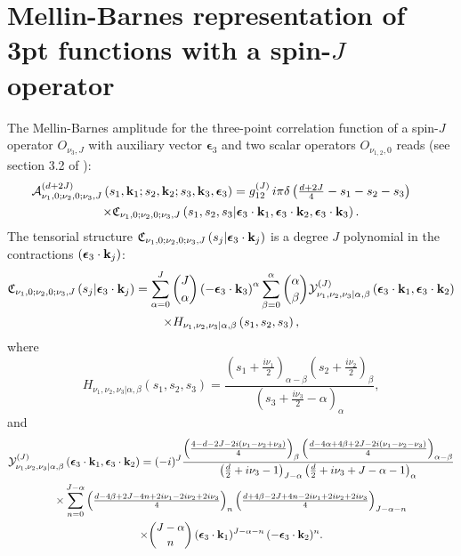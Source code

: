 \documentclass[11pt,a4paper]{article}
\begin{document}
\section{Mellin-Barnes representation of 3pt functions with a spin-$J$ operator}
\label{APP::00J}

The Mellin-Barnes amplitude for the three-point correlation function of a spin-$J$ operator $O_{\nu_3,J}$ with auxiliary vector $\boldsymbol{\epsilon}_3$ and two scalar operators $O_{\nu_{1,2},0}$ reads (see section 3.2 of \cite{Sleight:2019hfp}):
\begin{multline}\label{00J3ptA}
 \hspace*{-0.5cm}    {\cal A}^{\left(d+2J\right)}_{\nu_1,0;\nu_2,0;\nu_3,J}\left(s_1,{\bf k}_1;s_2,{\bf k}_2;s_3,{\bf k}_3,\boldsymbol{\epsilon}_3\right) = g^{\left(J\right)}_{12}\, i \pi \delta\left(\tfrac{d+2J}{4}-s_1-s_2-s_3\right)\, \\ \times  \mathfrak{C}_{\nu_1,0;\nu_2,0;\nu_3,J}\left(s_1,s_2,s_3|\boldsymbol{\epsilon}_3 \cdot {\bf k}_1,\boldsymbol{\epsilon}_3 \cdot {\bf k}_2,\boldsymbol{\epsilon}_3 \cdot {\bf k}_3\right).
\end{multline}
The tensorial structure $\mathfrak{C}_{\nu_1,0;\nu_2,0;\nu_3,J}\left(s_j|\boldsymbol{\epsilon}_3 \cdot {\bf k}_j\right)$ is a degree $J$ polynomial in the contractions $\left(\boldsymbol{\epsilon}_3 \cdot {\bf k}_j\right)$:
\begin{multline}\label{tensor00JA}
 \mathfrak{C}_{\nu_1,0;\nu_2,0;\nu_3,J}\left(s_j|\boldsymbol{\epsilon}_3 \cdot {\bf k}_j\right)=\sum^J_{\alpha=0}\binom{J}{\alpha} \left(- \boldsymbol{\epsilon}_3 \cdot {\bf k}_3\right)^\alpha \sum^\alpha_{\beta=0}\binom{\alpha}{\beta} {\cal Y}^{\left(J\right)}_{\nu_1,\nu_2,\nu_3|\alpha,\beta}\left(\boldsymbol{\epsilon}_3 \cdot {\bf k}_1,\boldsymbol{\epsilon}_3 \cdot {\bf k}_2\right)\\ \times  H_{\nu_1,\nu_2,\nu_3|\alpha,\beta}\left(s_1,s_2,s_3\right),
\end{multline}
where
\begin{equation}\label{Hab}
    H_{\nu_1,\nu_2,\nu_3|\alpha,\beta}\left(s_1,s_2,s_3\right) = \frac{\left(s_1+\frac{i\nu_1}{2}\right)_{\alpha-\beta}\left(s_2+\frac{i\nu_2}{2}\right)_{\beta}}{\left(s_3+\frac{i\nu_3}{2}-\alpha\right)_\alpha},
\end{equation}
and 
\begin{multline}\label{yab}
    \mathcal{Y}^{\left(J\right)}_{\nu_1,\nu_2,\nu_3|\alpha,\beta}\left(\boldsymbol{\epsilon}_3 \cdot {\bf k}_1,\boldsymbol{\epsilon}_3 \cdot {\bf k}_2\right)=(-i)^J\frac{\left(\tfrac{4-d-2 J-2i (\nu_1-\nu_2+\nu_3)}{4} \right)_\beta \left(\tfrac{d-4 \alpha+4 \beta+2 J-2 i (\nu_1-\nu_2-\nu_3)}{4}\right)_{\alpha-\beta}}{\left(\tfrac{d}{2}+i \nu_3-1\right)_{J-\alpha}\left(\frac{d}{2}+i \nu_3+J-\alpha-1\right)_\alpha}\\\times\sum_{n=0}^{J-\alpha}\left(\tfrac{d-4 \beta+2 J-4 n+2 i \nu_1-2 i \nu_2+2 i \nu_3}{4}\right)_n \left(\tfrac{d+4 \beta-2 J+4 n-2 i \nu_1+2 i \nu_2+2 i \nu_3}{4}\right)_{J-\alpha-n} \\\times \binom{J-\alpha}{n}\,({\boldsymbol{\epsilon}_3}\cdot \bold{k}_1)^{J-\alpha-n}\,(-{\boldsymbol{\epsilon}_3}\cdot \bold{k}_2)^n.
\end{multline}
\end{document}
